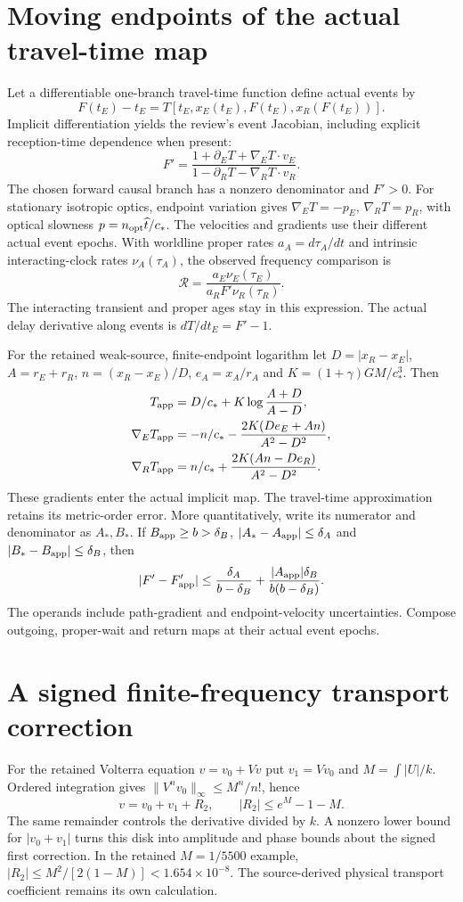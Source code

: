 \section{Moving endpoints of the actual travel-time map}
\label{sec:moving-travel-time-gradient}
Let a differentiable one-branch travel-time function define actual events by
\[
 F(t_E)-t_E=T[t_E,x_E(t_E),F(t_E),x_R(F(t_E))].
\]
Implicit differentiation yields the review's event Jacobian, including
explicit reception-time dependence when present:
\begin{equation}
 F'=\frac{1+\partial_ET+\nabla_ET\cdot v_E}
          {1-\partial_RT-\nabla_RT\cdot v_R}.
 \label{eq:full-moving-event-jacobian}
\end{equation}
The chosen forward causal branch has a nonzero denominator and $F'>0$.
For stationary isotropic optics, endpoint variation gives
$\nabla_ET=-p_E$, $\nabla_RT=p_R$, with optical slowness
$p=n_{\rm opt}\widehat t/c_*$.
The velocities and gradients use their different actual event epochs.
With worldline proper rates $a_A=d\tau_A/dt$ and intrinsic interacting-clock
rates $\nu_A(\tau_A)$, the observed frequency comparison is
\[
 \mathcal R=\frac{a_E\nu_E(\tau_E)}{a_RF'\nu_R(\tau_R)}.
\]
The interacting transient and proper ages stay in this expression. The
actual delay derivative along events is $dT/dt_E=F'-1$.

For the retained weak-source, finite-endpoint logarithm let
$D=|x_R-x_E|$, $A=r_E+r_R$, $n=(x_R-x_E)/D$,
$e_A=x_A/r_A$ and $K=(1+\gamma)GM/c_*^3$. Then
\begin{align}
 T_{\rm app}&=D/c_*+K\log\frac{A+D}{A-D},\\
 \nabla_ET_{\rm app}
 &=-n/c_*-\frac{2K(De_E+An)}{A^2-D^2},\\
 \nabla_RT_{\rm app}
 &= n/c_*+\frac{2K(An-De_R)}{A^2-D^2}.
\end{align}
These gradients enter the actual implicit map. The travel-time approximation
retains its metric-order error. More quantitatively, write its numerator and
denominator as $A_*,B_*$. If $B_{\rm app}\geq b>\delta_B$,
$|A_*-A_{\rm app}|\leq\delta_A$ and
$|B_*-B_{\rm app}|\leq\delta_B$, then
\[
 |F'-F'_{\rm app}|\leq
 \frac{\delta_A}{b-\delta_B}
 +\frac{|A_{\rm app}|\delta_B}{b(b-\delta_B)}.
\]
The operands include path-gradient and endpoint-velocity uncertainties.
Compose outgoing, proper-wait and return maps at their actual event epochs.

\section{A signed finite-frequency transport correction}
For the retained Volterra equation $v=v_0+Vv$ put $v_1=Vv_0$ and
$M=\int|U|/k$. Ordered integration gives
$\|V^nv_0\|_\infty\leq M^n/n!$, hence
\[
 v=v_0+v_1+R_2,\qquad |R_2|\leq e^M-1-M.
\]
The same remainder controls the derivative divided by $k$. A nonzero lower
bound for $|v_0+v_1|$ turns this disk into amplitude and phase bounds about
the signed first correction. In the retained $M=1/5500$ example,
$|R_2|\leq M^2/[2(1-M)]<1.654\times10^{-8}$.
The source-derived physical transport coefficient remains its own calculation.
